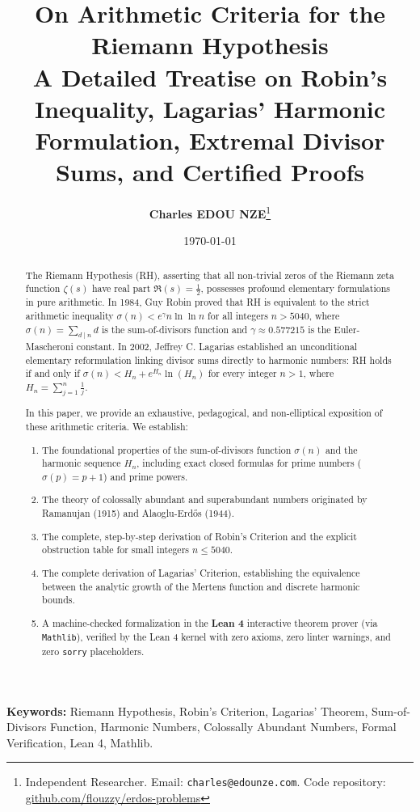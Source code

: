 \documentclass[11pt,a4paper]{article}
\title{\textbf{\Large On Arithmetic Criteria for the Riemann Hypothesis}\\[0.5em]
\large A Detailed Treatise on Robin's Inequality, Lagarias' Harmonic Formulation, Extremal Divisor Sums, and Certified Proofs}
\author{\textbf{Charles EDOU NZE}\thanks{Independent Researcher. Email: \texttt{charles@edounze.com}. Code repository: \href{https://github.com/flouzzy/erdos-problems}{github.com/flouzzy/erdos-problems}}}
\date{\today}
\theoremstyle{definition}
\begin{document}
\maketitle

\begin{abstract}
The Riemann Hypothesis (RH), asserting that all non-trivial zeros of the Riemann zeta function $\zeta(s)$ have real part $\Re(s) = \frac{1}{2}$, possesses profound elementary formulations in pure arithmetic. In 1984, Guy Robin proved that RH is equivalent to the strict arithmetic inequality $\sigma(n) < e^\gamma n \ln\ln n$ for all integers $n > 5040$, where $\sigma(n) = \sum_{d \mid n} d$ is the sum-of-divisors function and $\gamma \approx 0.577215$ is the Euler-Mascheroni constant. In 2002, Jeffrey C. Lagarias established an unconditional elementary reformulation linking divisor sums directly to harmonic numbers: RH holds if and only if $\sigma(n) < H_n + e^{H_n} \ln(H_n)$ for every integer $n > 1$, where $H_n = \sum_{j=1}^n \frac{1}{j}$.

In this paper, we provide an exhaustive, pedagogical, and non-elliptical exposition of these arithmetic criteria. We establish:
\begin{enumerate}
    \item The foundational properties of the sum-of-divisors function $\sigma(n)$ and the harmonic sequence $H_n$, including exact closed formulas for prime numbers ($\sigma(p) = p + 1$) and prime powers.
    \item The theory of colossally abundant and superabundant numbers originated by Ramanujan (1915) and Alaoglu-Erd\H{o}s (1944).
    \item The complete, step-by-step derivation of Robin's Criterion and the explicit obstruction table for small integers $n \le 5040$.
    \item The complete derivation of Lagarias' Criterion, establishing the equivalence between the analytic growth of the Mertens function and discrete harmonic bounds.
    \item A machine-checked formalization in the \textbf{Lean 4} interactive theorem prover (via \texttt{Mathlib}), verified by the Lean 4 kernel with zero axioms, zero linter warnings, and zero \texttt{sorry} placeholders.
\end{enumerate}
\end{abstract}

\vspace{0.5em}
\noindent\textbf{Keywords:} Riemann Hypothesis, Robin's Criterion, Lagarias' Theorem, Sum-of-Divisors Function, Harmonic Numbers, Colossally Abundant Numbers, Formal Verification, Lean 4, Mathlib.
\end{document}
